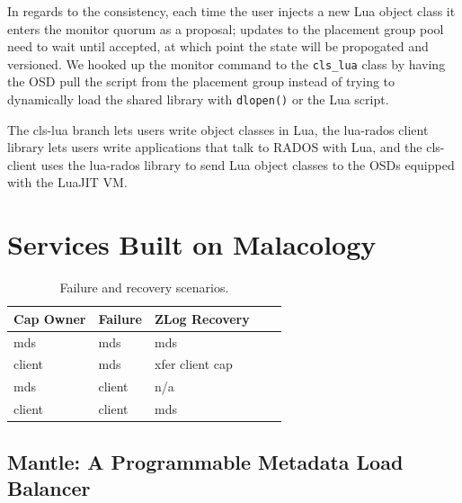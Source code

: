 \documentclass[10pt,twocolumn]{article}
\begin{document}
In regards to the consistency, each time the user injects a new Lua
object class it enters the monitor quorum as a proposal; updates to the
placement group pool need to wait until accepted, at which point the
state will be propogated and versioned. We hooked up the monitor command
to the \texttt{cls\_lua} class by having the OSD pull the script from
the placement group instead of trying to dynamically load the shared
library with \texttt{dlopen()} or the Lua script.

The cls-lua branch lets users write object classes in Lua, the lua-rados
client library lets users write applications that talk to RADOS with
Lua, and the cls-client uses the lua-rados library to send Lua object
classes to the OSDs equipped with the LuaJIT VM.


\section{Services Built on
Malacology}\label{services-built-on-malacology}

\label{services}

\begin{table}
\begin{tabular}{ | l | l | l | l | l |}
\hline
Cap Owner & Failure & ZLog Recovery \\ \hline
mds & mds & mds \\ \hline
client & mds & xfer client cap \\ \hline
mds & client & n/a \\ \hline
client & client & mds \\
\hline
\end{tabular}
\caption{Failure and recovery scenarios.}
\label{t:mds-zlog-fail}
\end{table}

\subsection{Mantle: A Programmable Metadata Load
Balancer}\label{mantle-a-programmable-metadata-load-balancer}
\end{document}
